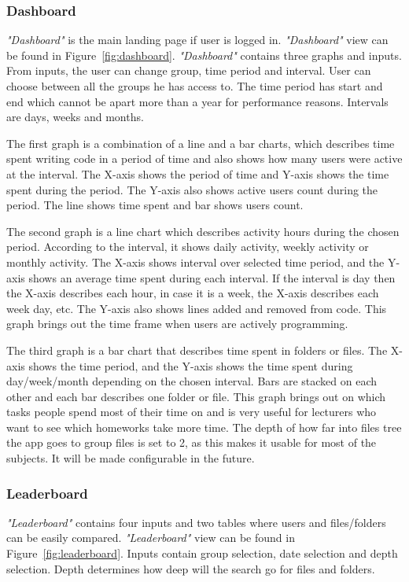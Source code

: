 \subsubsection{Dashboard}\label{subsubsec:dashboard}
\textit{"Dashboard"} is the main landing page if user is logged in.
\textit{"Dashboard"} view can be found in Figure~\ref{fig:dashboard}.
\textit{"Dashboard"} contains three graphs and inputs.
From inputs, the user can change group, time period and interval.
User can choose between all the groups he has access to.
The time period has start and end which cannot be apart more than a year for performance reasons.
Intervals are days, weeks and months.

The first graph is a combination of a line and a bar charts, which describes time spent writing code in a period of time and also shows how many users were active at the interval.
The X-axis shows the period of time and Y-axis shows the time spent during the period.
The Y-axis also shows active users count during the period.
The line shows time spent and bar shows users count.

The second graph is a line chart which describes activity hours during the chosen period.
According to the interval, it shows daily activity, weekly activity or monthly activity.
The X-axis shows interval over selected time period, and the Y-axis shows an average time spent during each interval.
If the interval is day then the X-axis describes each hour, in case it is a week, the X-axis describes each week day, etc.
The Y-axis also shows lines added and removed from code.
This graph brings out the time frame when users are actively programming.

The third graph is a bar chart that describes time spent in folders or files.
The X-axis shows the time period, and the Y-axis shows the time spent during day/week/month depending on the chosen interval.
Bars are stacked on each other and each bar describes one folder or file.
This graph brings out on which tasks people spend most of their time on and is very useful for lecturers who want to see which homeworks take more time.
The depth of how far into files tree the app goes to group files is set to 2, as this makes
it usable for most of the subjects.
It will be made configurable in the future.

\subsubsection{Leaderboard}\label{subsubsec:leaderboard}
\textit{"Leaderboard"} contains four inputs and two tables where users and files/folders can be easily compared.
\textit{"Leaderboard"} view can be found in Figure~\ref{fig:leaderboard}.
Inputs contain group selection, date selection and depth selection.
Depth determines how deep will the search go for files and folders.

